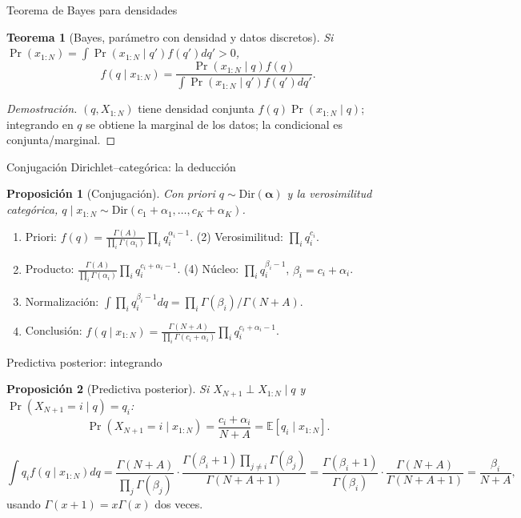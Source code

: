 \documentclass[aspectratio=169,10pt]{beamer}
\newtheorem{proposicion}{Proposición}
\newtheorem{teorema}{Teorema}
\begin{document}
\begin{frame}{Teorema de Bayes para densidades}
\begin{teorema}[Bayes, parámetro con densidad y datos discretos]
Si $\Pr(x_{1:N})=\int\Pr(x_{1:N}\mid q')f(q')dq'>0$,
\[f(q\mid x_{1:N})=\frac{\Pr(x_{1:N}\mid q)f(q)}{\int\Pr(x_{1:N}\mid q')f(q')dq'}.\]
\end{teorema}
\begin{proof}[Demostración]
$(q,X_{1:N})$ tiene densidad conjunta $f(q)\Pr(x_{1:N}\mid q)$; integrando en $q$ se obtiene
la marginal de los datos; la condicional es conjunta/marginal.
\end{proof}
\end{frame}

\begin{frame}{Conjugación Dirichlet--categórica: la deducción}
\begin{proposicion}[Conjugación]
Con priori $q\sim\mathrm{Dir}(\boldsymbol\alpha)$ y la verosimilitud categórica,
$q\mid x_{1:N}\sim\mathrm{Dir}(c_1+\alpha_1,\ldots,c_K+\alpha_K)$.
\end{proposicion}
\small
\begin{enumerate}
\item Priori: $f(q)=\frac{\Gamma(A)}{\prod_i\Gamma(\alpha_i)}\prod_iq_i^{\alpha_i-1}$.\quad
(2) Verosimilitud: $\prod_iq_i^{c_i}$.
\setcounter{enumi}{2}
\item Producto: $\frac{\Gamma(A)}{\prod_i\Gamma(\alpha_i)}\prod_iq_i^{c_i+\alpha_i-1}$.\quad
(4) Núcleo: $\prod_iq_i^{\beta_i-1}$, $\beta_i=c_i+\alpha_i$.
\setcounter{enumi}{4}
\item Normalización: $\int\prod_iq_i^{\beta_i-1}dq=\prod_i\Gamma(\beta_i)/\Gamma(N+A)$.
\item Conclusión: $f(q\mid x_{1:N})=\frac{\Gamma(N+A)}{\prod_i\Gamma(c_i+\alpha_i)}\prod_iq_i^{c_i+\alpha_i-1}$.
\end{enumerate}
\end{frame}

\begin{frame}{Predictiva posterior: integrando}
\begin{proposicion}[Predictiva posterior]
Si $X_{N+1}\perp X_{1:N}\mid q$ y $\Pr(X_{N+1}=i\mid q)=q_i$:
\[\Pr(X_{N+1}=i\mid x_{1:N})=\frac{c_i+\alpha_i}{N+A}=\mathbb E[q_i\mid x_{1:N}].\]
\end{proposicion}
\small
\[\int q_if(q\mid x_{1:N})dq=\frac{\Gamma(N+A)}{\prod_j\Gamma(\beta_j)}\cdot\frac{\Gamma(\beta_i+1)\prod_{j\ne i}\Gamma(\beta_j)}{\Gamma(N+A+1)}
=\frac{\Gamma(\beta_i+1)}{\Gamma(\beta_i)}\cdot\frac{\Gamma(N+A)}{\Gamma(N+A+1)}=\frac{\beta_i}{N+A},\]
usando $\Gamma(x+1)=x\Gamma(x)$ dos veces.
\end{frame}
\end{document}
